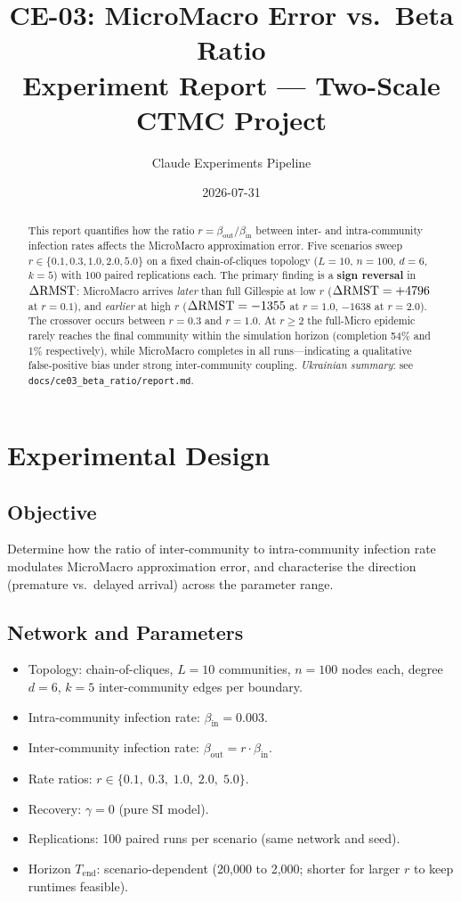 \documentclass[11pt,a4paper]{article}
\title{CE-03: MicroMacro Error vs.\ Beta Ratio\\
       \large Experiment Report --- Two-Scale CTMC Project}
\author{Claude Experiments Pipeline}
\date{2026-07-31}
\begin{document}
\maketitle

\begin{abstract}
This report quantifies how the ratio $r = \beta_{\text{out}}/\beta_{\text{in}}$
between inter- and intra-community infection rates affects the MicroMacro
approximation error.  Five scenarios sweep $r \in \{0.1, 0.3, 1.0, 2.0, 5.0\}$
on a fixed chain-of-cliques topology ($L=10$, $n=100$, $d=6$, $k=5$)
with 100 paired replications each.
The primary finding is a \textbf{sign reversal} in $\Delta\mathrm{RMST}$:
MicroMacro arrives \emph{later} than full Gillespie at low $r$
($\Delta\mathrm{RMST} = {+}4796$ at $r=0.1$), and \emph{earlier} at high $r$
($\Delta\mathrm{RMST} = -1355$ at $r=1.0$, $-1638$ at $r=2.0$).
The crossover occurs between $r=0.3$ and $r=1.0$.
At $r \ge 2$ the full-Micro epidemic rarely reaches the final community
within the simulation horizon (completion 54\% and 1\% respectively),
while MicroMacro completes in all runs---indicating a qualitative
false-positive bias under strong inter-community coupling.
\textit{Ukrainian summary}: see \texttt{docs/ce03\_beta\_ratio/report.md}.
\end{abstract}

\section{Experimental Design}

\subsection{Objective}
Determine how the ratio of inter-community to intra-community infection rate
modulates MicroMacro approximation error, and characterise the direction
(premature vs.\ delayed arrival) across the parameter range.

\subsection{Network and Parameters}
\begin{itemize}
  \item Topology: chain-of-cliques, $L=10$ communities, $n=100$ nodes each,
        degree $d=6$, $k=5$ inter-community edges per boundary.
  \item Intra-community infection rate: $\beta_{\text{in}} = 0.003$.
  \item Inter-community infection rate: $\beta_{\text{out}} = r \cdot \beta_{\text{in}}$.
  \item Rate ratios: $r \in \{0.1,\; 0.3,\; 1.0,\; 2.0,\; 5.0\}$.
  \item Recovery: $\gamma = 0$ (pure SI model).
  \item Replications: 100 paired runs per scenario (same network and seed).
  \item Horizon $T_{\text{end}}$: scenario-dependent (20{,}000 to 2{,}000;
        shorter for larger $r$ to keep runtimes feasible).
\end{itemize}
\end{document}
